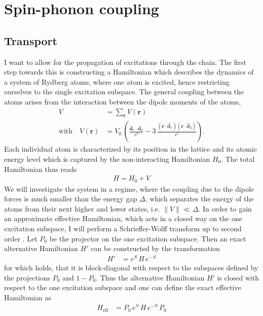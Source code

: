 \chapter*{Spin-phonon coupling}

\section*{Transport}
I want to allow for the propagation of excitations through the chain. The first step towards this is constructing a Hamiltonian which describes the dynamics of a system of Rydberg atoms, where one atom is excited, hence restricting ourselves to the single excitation subspace. The general coupling between the atoms arises from the interaction between the dipole moments of the atoms,
\begin{align*}
    V&=\sum_\mathbf{r}V(\mathbf{r})\\
    \text{with}\quad V(\mathbf{r})&= V_0\,\left(\frac{\mathbf{\hat{d}}_1\cdot\mathbf{\hat{d}}_2}{r^3}-3\,\frac{(\mathbf{r}\cdot \mathbf{\hat{d}}_1)(\mathbf{r}\cdot \mathbf{\hat{d}}_2)}{r^5}\right).
\end{align*}
Each individual atom is characterized by its position in the lattice and its atomic energy level which is captured by the non-interacting Hamiltonian $H_0$. The total Hamiltonian thus reads
\begin{align*}
    H = H_0 + V
\end{align*}
We will investigate the system in a regime, where the coupling due to the dipole forces is much smaller than the energy gap $\Delta$, which separates the energy of the atoms from their next higher and lower states, i.e. $\lVert V \rVert\ll\Delta$. In order to gain an approximate effective Hamiltonian, which acts in a closed way on the one excitation subspace, I will perform a Schrieffer-Wolff transform up to second order \cite{bravyi_schrieffer-wolff_2011}. Let $P_0$ be the projector on the one excitation subspace. Then an exact alternative Hamiltonian $H'$ can be constructed by the transformation
\begin{align*}
    H'&= e^S\,H\,e^{-S}
\end{align*}
for which holds, that it is block-diagonal with respect to the subspaces defined by the projections $P_0$ and $1-P_0$. Thus the alternative Hamiltonian $H'$ is closed with respect to the one excitation subspace and one can define the exact effective Hamiltonian as
\begin{align*}
    H_\text{eff}&=P_0\, e^S\,H\,e^{-S}\,P_0
\end{align*}
